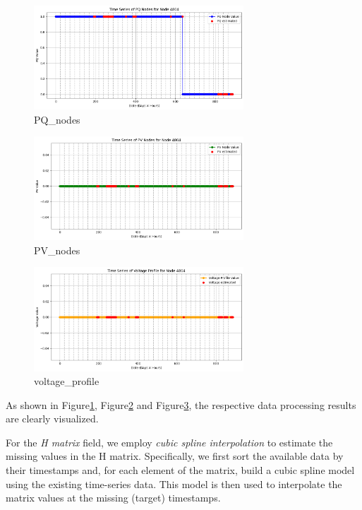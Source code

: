 \documentclass[12pt]{article}
\begin{document}
\begin{figure}[H]
    \centering
    \includegraphics[width=0.7\textwidth]{picture/PQ_nodes.png}
    \caption{PQ\_nodes}
\label{fig:PQ_nodes}
\end{figure}

\begin{figure}[H]
    \centering
    \includegraphics[width=0.7\textwidth]{picture/PV_nodes.png}
    \caption{PV\_nodes}
\label{fig:PV_nodes}
\end{figure}

\begin{figure}[H]
    \centering
    \includegraphics[width=0.7\textwidth]{picture/voltage_profile.png}
    \caption{voltage\_profile}
\label{fig:voltage_profile}
\end{figure}

As shown in Figure\ref{fig:PQ_nodes}, Figure\ref{fig:PV_nodes} and Figure\ref{fig:voltage_profile}, the respective data processing results are clearly visualized.

For the \emph{H matrix} field, we employ \emph{cubic spline interpolation} to estimate the missing values in the H matrix. Specifically, we first sort the available data by their timestamps and, for each element of the matrix, build a cubic spline model using the existing time-series data. This model is then used to interpolate the matrix values at the missing (target) timestamps.
\end{document}
